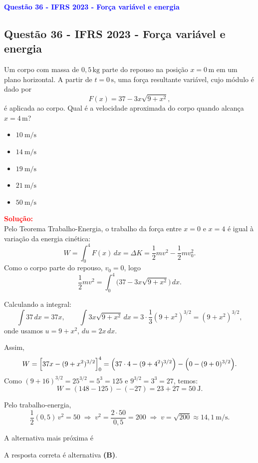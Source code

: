 \begin{flushleft}
\textbf{\textcolor{blue}{\Large Quest\~ao 36 - IFRS 2023 - For\c{c}a vari\'avel e energia}}\\
\noindent

\subsection{Quest\~ao 36 - IFRS 2023 - For\c{c}a vari\'avel e energia}

Um corpo com massa de $0{,}5\,\text{kg}$ parte do repouso na posi\c{c}\~ao $x=0\,\text{m}$ em um plano horizontal.
A partir de $t=0\,\text{s}$, uma for\c{c}a resultante vari\'avel, cujo m\'odulo \'e dado por
\[
F(x)=37-3x\sqrt{9+x^{2}},
\]
\'e aplicada ao corpo. Qual \'e a velocidade aproximada do corpo quando alcan\c{c}a $x=4\,\text{m}$?

\begin{itemize}
\item[(A)] $10\ \text{m/s}$
\item[(B)] $14\ \text{m/s}$
\item[(C)] $19\ \text{m/s}$
\item[(D)] $21\ \text{m/s}$
\item[(E)] $50\ \text{m/s}$
\end{itemize}

\vspace{0.5cm}

\textcolor{red}{\textbf{Solu\c{c}\~ao:}}\\

Pelo Teorema Trabalho-Energia, o trabalho da for\c{c}a entre $x=0$ e $x=4$ \'e igual \`a varia\c{c}\~ao da energia cin\'etica:
\[
W=\int_{0}^{4}F(x)\,dx=\Delta K=\frac{1}{2}m v^{2}-\frac{1}{2}m v_0^{2}.
\]
Como o corpo parte do repouso, $v_0=0$, logo
\[
\frac{1}{2}m v^{2}=\int_{0}^{4}\bigl(37-3x\sqrt{9+x^{2}}\bigr)\,dx.
\]

Calculando a integral:
\[
\int 37\,dx=37x,
\qquad
\int 3x\sqrt{9+x^{2}}\,dx
=3\cdot\frac{1}{3}(9+x^{2})^{3/2}=(9+x^{2})^{3/2},
\]
onde usamos $u=9+x^{2}$, $du=2x\,dx$.

Assim,
\[
W=\Bigl[37x-(9+x^{2})^{3/2}\Bigr]_{0}^{4}
=\Bigl(37\cdot4-(9+4^{2})^{3/2}\Bigr)-\Bigl(0-(9+0)^{3/2}\Bigr).
\]
Como $(9+16)^{3/2}=25^{3/2}=5^{3}=125$ e $9^{3/2}=3^{3}=27$, temos:
\[
W=(148-125)-(-27)=23+27=50\ \text{J}.
\]

Pelo trabalho-energia,
\[
\frac{1}{2}(0{,}5)\,v^{2}=50
\;\Rightarrow\;
v^{2}=\frac{2\cdot50}{0{,}5}=200
\;\Rightarrow\;
v=\sqrt{200}\approx 14{,}1\ \text{m/s}.
\]

A alternativa mais pr\'oxima \'e

A resposta correta é alternativa \colorbox{green!50}{\textbf{(B)}}.
\end{flushleft}


